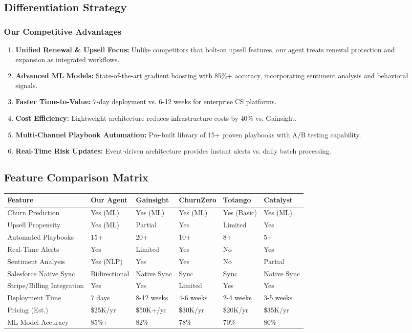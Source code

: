 \documentclass[12pt,a4paper]{article}
\begin{document}
\subsection{Differentiation Strategy}
\subsubsection{Our Competitive Advantages}
\begin{enumerate}
    \item \textbf{Unified Renewal \& Upsell Focus:} Unlike competitors that bolt-on upsell features, our agent treats renewal protection and expansion as integrated workflows.
    \item \textbf{Advanced ML Models:} State-of-the-art gradient boosting with 85\%+ accuracy, incorporating sentiment analysis and behavioral signals.
    \item \textbf{Faster Time-to-Value:} 7-day deployment vs. 6-12 weeks for enterprise CS platforms.
    \item \textbf{Cost Efficiency:} Lightweight architecture reduces infrastructure costs by 40\% vs. Gainsight.
    \item \textbf{Multi-Channel Playbook Automation:} Pre-built library of 15+ proven playbooks with A/B testing capability.
    \item \textbf{Real-Time Risk Updates:} Event-driven architecture provides instant alerts vs. daily batch processing.
\end{enumerate}

\subsection{Feature Comparison Matrix}
\begin{longtable}{|l|l|l|l|l|l|}
\hline
\textbf{Feature} & \textbf{Our Agent} & \textbf{Gainsight} & \textbf{ChurnZero} & \textbf{Totango} & \textbf{Catalyst} \\
\hline
Churn Prediction & Yes (ML) & Yes (ML) & Yes (ML) & Yes (Basic) & Yes (ML) \\
\hline
Upsell Propensity & Yes (ML) & Partial & Yes & Limited & Yes \\
\hline
Automated Playbooks & 15+ & 20+ & 10+ & 8+ & 5+ \\
\hline
Real-Time Alerts & Yes & Limited & Yes & No & Yes \\
\hline
Sentiment Analysis & Yes (NLP) & Yes & Yes & No & Partial \\
\hline
Salesforce Native Sync & Bidirectional & Native Sync & Sync & Sync & Native Sync \\
\hline
Stripe/Billing Integration & Yes & Yes & Limited & Yes & Yes \\
\hline
Deployment Time & 7 days & 8-12 weeks & 4-6 weeks & 2-4 weeks & 3-5 weeks \\
\hline
Pricing (Est.) & \$25K/yr & \$50K+/yr & \$30K/yr & \$20K/yr & \$35K/yr \\
\hline
ML Model Accuracy & 85\%+ & 82\% & 78\% & 70\% & 80\% \\
\hline
\end{longtable}
\end{document}
